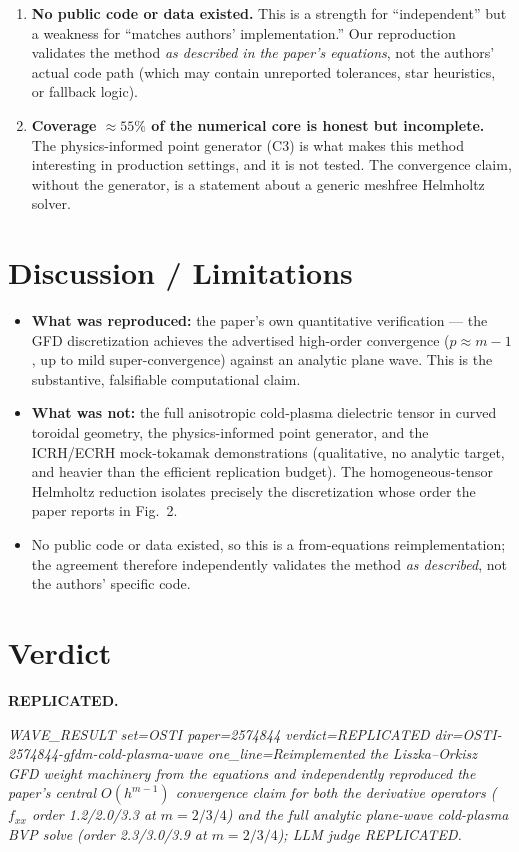 \documentclass[11pt]{article}
\begin{document}
\begin{enumerate}[leftmargin=1.4em]
  \item \textbf{No public code or data existed.} This is a strength for
    ``independent'' but a weakness for ``matches authors' implementation.''
    Our reproduction validates the method \emph{as described in the paper's
    equations}, not the authors' actual code path (which may contain
    unreported tolerances, star heuristics, or fallback logic).

  \item \textbf{Coverage $\approx 55\%$ of the numerical core is honest but
    incomplete.} The physics-informed point generator (C3) is what makes
    this method interesting in production settings, and it is not tested.
    The convergence claim, without the generator, is a statement about
    a generic meshfree Helmholtz solver.
\end{enumerate}

\section{Discussion / Limitations}
\begin{itemize}[leftmargin=1.4em]
  \item \textbf{What was reproduced:} the paper's own quantitative
        verification --- the GFD discretization achieves the advertised
        high-order convergence ($p\approx m-1$, up to mild
        super-convergence) against an analytic plane wave. This is the
        substantive, falsifiable computational claim.
  \item \textbf{What was not:} the full anisotropic cold-plasma dielectric
        tensor in curved toroidal geometry, the physics-informed point
        generator, and the ICRH/ECRH mock-tokamak demonstrations
        (qualitative, no analytic target, and heavier than the efficient
        replication budget). The homogeneous-tensor Helmholtz reduction
        isolates precisely the discretization whose order the paper reports
        in Fig.~2.
  \item No public code or data existed, so this is a from-equations
        reimplementation; the agreement therefore independently validates
        the method \emph{as described}, not the authors' specific code.
\end{itemize}

\section*{Verdict}
\textbf{REPLICATED.}

\vspace{1em}
\noindent\textit{WAVE\_RESULT set=OSTI paper=2574844 verdict=REPLICATED
dir=OSTI-2574844-gfdm-cold-plasma-wave
one\_line=Reimplemented the Liszka--Orkisz GFD weight machinery from the
equations and independently reproduced the paper's central
$O(h^{m-1})$ convergence claim for both the derivative operators
($f_{xx}$ order 1.2/2.0/3.3 at $m=2/3/4$) and the full analytic
plane-wave cold-plasma BVP solve (order 2.3/3.0/3.9 at $m=2/3/4$);
LLM judge REPLICATED.}
\end{document}
